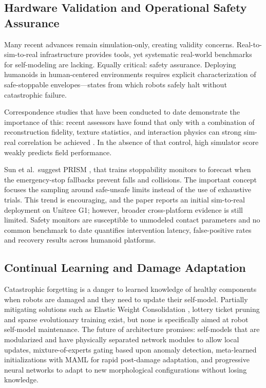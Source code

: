 \documentclass[11pt,a4paper]{article}
\begin{document}
\subsection{Hardware Validation and Operational Safety Assurance}

Many recent advances remain simulation-only, creating validity concerns. Real-to-sim-to-real infrastructure \cite{torne2024rialto,yu2025real2render2real,jain2025polaris} provides tools, yet systematic real-world benchmarks for self-modeling are lacking. Equally critical: safety assurance. Deploying humanoids in human-centered environments requires explicit characterization of safe-stoppable envelopes—states from which robots safely halt without catastrophic failure.

Correspondence studies that have been conducted to date demonstrate the importance of this: recent assessors have found that only with a combination of reconstruction fidelity, texture statistics, and interaction physics can strong sim-real correlation be achieved \cite{jain2025polaris,li2024simpler}. In the absence of that control, high simulator score weakly predicts field performance.

Sun et al.~suggest PRISM \cite{sun2026prism}, that trains stoppability monitors to forecast when the emergency-stop fallbacks prevent falls and collisions. The important concept focuses the sampling around safe-unsafe limits instead of the use of exhaustive trials. This trend is encouraging, and the paper reports an initial sim-to-real deployment on Unitree G1; however, broader cross-platform evidence is still limited. Safety monitors are susceptible to unmodeled contact parameters and no common benchmark to date quantifies intervention latency, false-positive rates and recovery results across humanoid platforms.

\subsection{Continual Learning and Damage Adaptation}

Catastrophic forgetting is a danger to learned knowledge of healthy components when robots are damaged and they need to update their self-model. Partially mitigating solutions such as Elastic Weight Consolidation \cite{kirkpatrick2017overcoming}, lottery ticket pruning \cite{frankle2018lottery} and sparse evolutionary training \cite{mocanu2018scalable} exist, but none is specifically aimed at robot self-model maintenance. The future of architecture promises: self-models that are modularized and have physically separated network modules to allow local updates, mixture-of-experts gating based upon anomaly detection, meta-learned initializations with MAML \cite{finn2017maml} for rapid post-damage adaptation, and progressive neural networks to adapt to new morphological configurations without losing knowledge.
\end{document}
